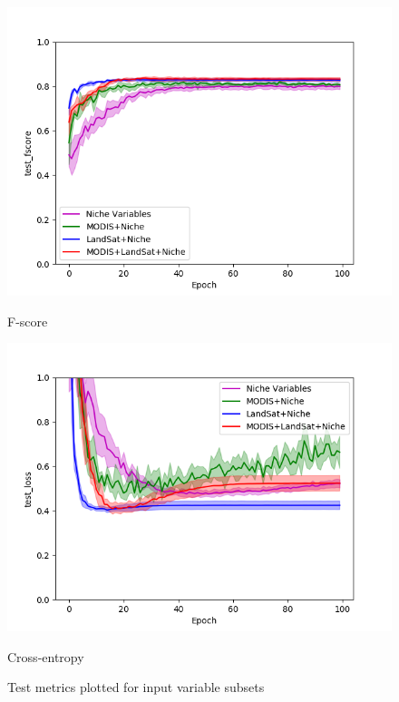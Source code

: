 \def\year{2017}\relax \documentclass[letterpaper]{article}
\begin{document}
\begin{figure}
\begin{minipage}{.24\textwidth}
  \centering
\includegraphics[width=\textwidth]{pics/test_fscore_mean_variables.png}
\caption{F-score}\label{fig:subsetfscore}
\end{minipage}
\begin{minipage}{.01\textwidth}
\end{minipage}
\begin{minipage}{.24\textwidth}
  \centering
\includegraphics[width=\textwidth]{pics/test_loss_mean_variables.png}
\caption{Cross-entropy}\label{fig:subsetloss}
\end{minipage}
\caption{Test metrics plotted for input variable subsets}\label{fig:testmetrics}
\end{figure}
\end{document}
